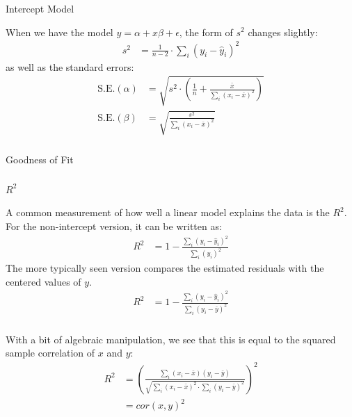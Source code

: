 \begin{frame}[fragile] \frametitle{}

{\color{yaleblue}\fontsize{16pt}{20pt}\selectfont Intercept Model}

When we have the model $y = \alpha + x \beta + \epsilon$, the form of $s^2$
changes slightly:
\begin{align*}
s^2 &= \frac{1}{n-2} \cdot \sum_i (y_i - \widehat{y}_i)^2
\end{align*}
\pause as well as the standard errors:
\begin{align*}
\text{S.E.}(\alpha) &= \sqrt{s^2 \cdot \left(\frac{1}{n} + \frac{\bar{x}}{\sum_i (x_i-\bar{x})^2} \right)} \\
\text{S.E.}(\beta) &= \sqrt{\frac{s^2}{\sum_i (x_i-\bar{x})^2}}
\end{align*}

\end{frame}

\begin{frame}[fragile] \frametitle{}

\begin{flushright}
{\color{yaleblue}\sc\fontsize{1cm}{0cm}\selectfont Goodness of Fit}
\end{flushright}

\end{frame}

\begin{frame}[fragile] \frametitle{}

{\color{yaleblue}\fontsize{16pt}{20pt}\selectfont $R^2$}

A common measurement of how well a linear model explains
the data is the $R^2$. For the non-intercept version, it
can be written as:
\begin{align*}
R^2 &= 1 - \frac{\sum_i (y_i - \widehat{y}_i)^2}{\sum_i (y_i)^2}
\end{align*}
\pause The more typically seen version compares the estimated
residuals with the centered values of $y$.
\begin{align*}
R^2 &= 1 - \frac{\sum_i (y_i - \widehat{y}_i)^2}{\sum_i (y_i - \bar{y})^2}
\end{align*}

\end{frame}

\begin{frame}[fragile] \frametitle{}

With a bit of algebraic manipulation, we see that this is
equal to the squared sample correlation of $x$ and $y$:
\begin{align*}
R^2 &= \left( \frac{\sum_i (x_i - \bar{x})(y_i - \bar{y})}{\sqrt{\sum_i (x_i - \bar{x})^2 \cdot \sum_i (y_i - \bar{y})^2}} \right)^2 \\
&= cor(x,y)^2
\end{align*}

\end{frame}

